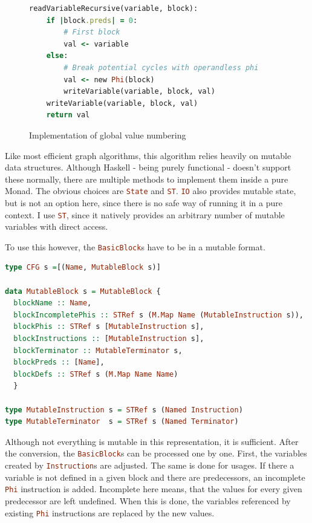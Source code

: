\documentclass[a4paper,bibliography=totocnumbered,parskip,headsepline]{scrbook}
\begin{document}
\begin{figure}
\begin{lstlisting}[language=ruby]
readVariableRecursive(variable, block):
    if |block.preds| = 0:
        # First block
        val <- variable
    else:
        # Break potential cycles with operandless phi
        val <- new Phi(block)
        writeVariable(variable, block, val)
    writeVariable(variable, block, val)
    return val
\end{lstlisting}
\caption{Implementation of global value numbering}
\label{fig:globalnum}
\end{figure}

Like most efficient graph algorithms, this algorithm relies heavily on mutable data structures.
Although Haskell - being purely functional - doesn't support these normally, there are multiple methods to implement them inside a pure Monad.
The obvious choices are \lstinline[language=haskell]!State! and \lstinline[language=haskell]!ST!.
\lstinline[language=haskell]!IO! also provides mutable state, but is not an option here, since there is no safe way of running it in a pure context.
I use \lstinline[language=haskell]!ST!, since it natively provides an arbitrary number of mutable variables with direct access.

To use this however, the \lstinline[language=haskell]!BasicBlock!s have to be in a mutable format.

\begin{lstlisting}[language=haskell]
type CFG s =[(Name, MutableBlock s)]

data MutableBlock s = MutableBlock {
  blockName :: Name,
  blockIncompletePhis :: STRef s (M.Map Name (MutableInstruction s)),
  blockPhis :: STRef s [MutableInstruction s],
  blockInstructions :: [MutableInstruction s],
  blockTerminator :: MutableTerminator s,
  blockPreds :: [Name],
  blockDefs :: STRef s (M.Map Name Name)
  }

type MutableInstruction s = STRef s (Named Instruction)
type MutableTerminator  s = STRef s (Named Terminator)
\end{lstlisting}

Although not everything is mutable in this representation, it is sufficient.
After the conversion, the \lstinline[language=haskell]!BasicBlock!s can be processed one by one.
First, the variables created by \lstinline[language=haskell]!Instruction!s are adjusted.
The same is done for usages.
If there a variable is not defined in a given block and there are predecessors, an incomplete \lstinline[language=haskell]!Phi! instruction is added.
Incomplete here means, that the values for every given predecessor are left undefined.
When this is done, the variables referenced by existing \lstinline[language=haskell]!Phi! instructions are replaced by the new values.
\end{document}
